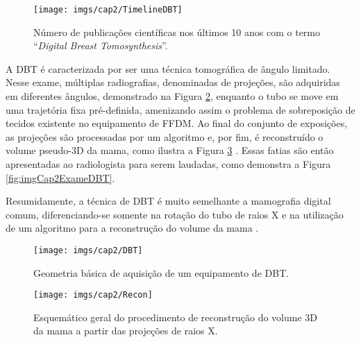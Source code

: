  
\begin{figure}[H]
	\caption{Número de publicações científicas nos últimos 10 anos com o termo ``\textit{Digital Breast Tomosynthesis}''.}
	\begin{center}
		\texttt{[image: imgs/cap2/TimelineDBT]}
	\end{center}
	\label{fig:imgCap2TimelineDBT}
\end{figure}

A \acs{DBT} é caracterizada por ser uma técnica tomográfica de ângulo limitado. Nesse exame, múltiplas radiografias, denominadas de projeções, são adquiridas em diferentes ângulos, demonstrado na Figura \ref{fig:imgCap2DBTEstrutura}, enquanto o tubo se move em uma trajetória fixa pré-definida, amenizando assim o problema de sobreposição de tecidos existente no equipamento de \acs{FFDM}. Ao final do conjunto de exposições, as projeções são processadas por um algoritmo e, por fim, é reconstruído o volume pseudo-\acs{3D} da mama, como ilustra a Figura \ref{fig:imgCap2ExameDBTRecon} \cite{vedantham2015digital,michell2018role}. Essas fatias são então apresentadas ao radiologista para serem laudadas, como demonstra a Figura \ref{fig:imgCap2ExameDBT}. 

Resumidamente, a técnica de \acs{DBT} é muito semelhante a mamografia digital comum,  diferenciando-se somente na rotação do tubo de raios X e na utilização de um algoritmo para a reconstrução do volume da mama \cite{michell2018role}.

\begin{figure}[H]
	\caption{Geometria básica de aquisição de um equipamento de \acs{DBT}.}
	\begin{center}
		\texttt{[image: imgs/cap2/DBT]}
	\end{center}
	\label{fig:imgCap2DBTEstrutura}
\end{figure}


\begin{figure}[H]
	\caption{Esquemático geral do procedimento de reconstrução do volume \acs{3D} da mama a partir das projeções de raios X.}
	\begin{center}
		\texttt{[image: imgs/cap2/Recon]}
	\end{center}
	\label{fig:imgCap2ExameDBTRecon}
\end{figure}

